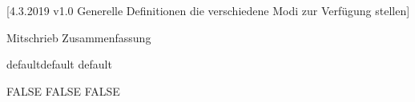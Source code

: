 [4.3.2019 v1.0 Generelle Definitionen die verschiedene Modi zur Verfügung stellen]



\providecommand{\LILLYxMODE}{default}
\providecommand\LILLYxMODExDEFAULT{default}
\providecommand\LILLYxMODExDUMMY{dummy}

\providecommand{\LILLYxBOXxMODE}{DEFAULT}
\providecommand{\LILLYxFOOTERxBUTTONS}{TRUE}

\def\LILLY@Typ@Mitschrieb{Mitschrieb}
\def\LILLY@Typ@Uebungsblatt{Uebungsblatt}
\def\LILLY@Typ@Dokumentation{Dokumentation}
\def\LILLY@Typ@Zusammenfassung{Zusammenfassung}

\ifx\LILLY@Typ\LILLY@Typ@Mitschrieb
    \providecommand{\LILLYxBOXxAufgabexBox}{FALSE}
\fi
\ifx\LILLY@Typ\LILLY@Typ@Zusammenfassung
\RequirePackage{imakeidx} %
\fi


\ifx\LILLYxMODE\LILLYxMODExDEFAULT
    \providecommand\LILLYxBOXxBeispielxBox{FALSE}
\else\ifx\LILLYxMODE\LILLYxMODExPRINT
    
    \renewcommand{\LILLYxFOOTERxBUTTONS}{FALSE}
    \providecommand{\LILLYxHYPERLINK}{FALSE}
    \providecommand\LILLYxBOXxBemerkungxBox{FALSE}
    \providecommand\LILLYxBOXxBeweisxBox{FALSE}
    \providecommand\LILLYxBOXxBeispielxBox{FALSE}
    \providecommand\LILLYxBOXxLemmaxBox{FALSE}
    \raggedbottom  %
\fi\fi 


\ifx\LILLYxMODExEXTRA\true %
\else
\fi


\ifx\LILLYxBOXxBeispielxBox\true\else\renewcommand{\LILLYxColorxBeispiel}{Charcoal}\fi
\ifx\LILLYxBOXxBeweisxBox\true\else\renewcommand{\LILLYxColorxBeweis}{Charcoal}\fi
\ifx\LILLYxBOXxBemerkungxBox\true\else\renewcommand{\LILLYxColorxBemerkung}{Charcoal}\fi





